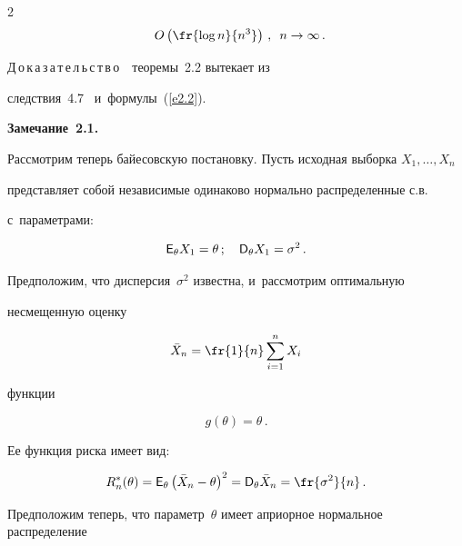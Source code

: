 \begin{multicols}{2}
\begin{multline*}
O\left(\fr{\log n}{n^3}\right)\,,\enskip  n \to \infty\,.\hspace*{-5.3156pt}


\end{multline*}





\noindent


Д\,о\,к\,а\,з\,а\,т\,е\,л\,ь\,с\,т\,в\,о~~теоремы~2.2 вытекает из 


следствия~4.7~\cite{2-ben} и~формулы~(\ref{e2.2}).





\smallskip





\noindent


\textbf{Замечание~2.1.}\


Рассмотрим теперь байесовскую постановку. Пусть исходная выборка $X_1,\ldots,X_n$ 


представляет собой независимые одинаково нормально распределенные с.в.\


с~параметрами:


$$


{\sf E}_\theta X_1 = \theta\,;\quad {\sf D}_\theta X_1 = \sigma^2\,.


$$


Предположим, что дисперсия~$\sigma^2$ известна, и~рассмотрим оптимальную 


несмещенную оценку





\noindent


$$


\bar X_n = \fr{1}{n} \sum\limits_{i=1}^n X_i


$$


функции


$$


g(\theta) = \theta\,.


$$


Ее функция риска имеет вид:


$$


R^*_{n}(\theta) = {\sf E}_\theta \left(\bar X_n - \theta\right)^2 =


 {\sf D}_\theta \bar X_n = \fr{\sigma^2}{n}\,.


$$


Предположим теперь, что параметр~$\theta$ имеет априорное нормальное распределение 



\end{multicols}
